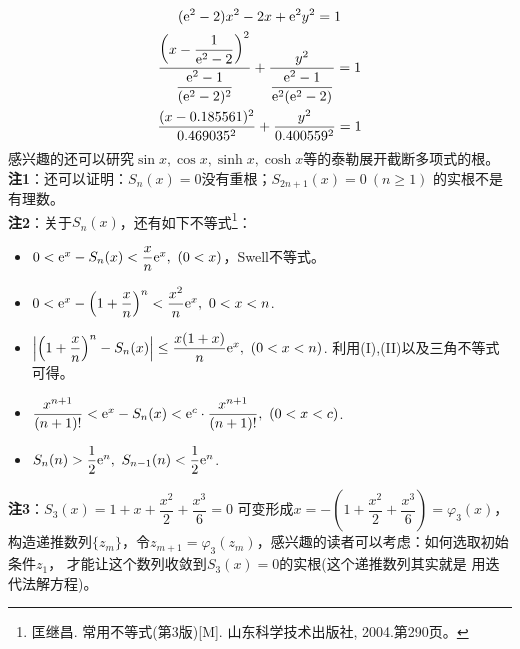 \begin{enumerate}[label={【\textbf{例\thechapter.\arabic*}】},
 leftmargin=\inteval{\myenumleftmargin}pt,
 itemsep=\inteval{\myenumitempsep}pt,
 itemindent=\inteval{\myenumitemindent}pt]
\begin{gather*}
    (\mathrm{e}^2-2)x^2-2x+\mathrm{e}^2y^2=1 \\
    \dfrac{\left(x-\dfrac{1}{\mathrm{e}^2-2}\right)^2}{\dfrac{\mathrm{e}^2-1}{(\mathrm{e}^2-2)^2}}+
    \dfrac{y^2}{\dfrac{\mathrm{e}^2-1}{\mathrm{e}^2(\mathrm{e}^2-2)}}=1 \\
    \dfrac{(x-0.185561)^2}{0.469035^2}+\dfrac{y^2}{0.400559^2}=1
\end{gather*}
感兴趣的还可以研究$ \sin x,\cos x,\sinh x,\cosh x $等的泰勒展开截断多项式的根。\\
\textbf{注1}：还可以证明：$ S_n(x)=0 $没有重根；$ S_{2n+1}(x)=0\ (n\geq 1) $
的实根不是有理数。\\
\textbf{注2}：关于$ S_n(x) $，还有如下不等式\footnote{匡继昌. 
    常用不等式(第3版)[M]. 山东科学技术出版社, 2004.第290页。}：
\begin{itemize}
\item $ 0<\e^x-S_n(x)<\dfrac{x}{n}\e^x,\ (0<x) $，Swell不等式。
\item $ 0<\mathrm{e}^x-\left(1+\dfrac{x}{n}\right)^n<\dfrac{x^2}{n}\mathrm{e}^x,
\ 0<x<n $.
\item $ \left|\left(1+\dfrac{x}{n}\right)^n-S_n(x)\right|
\leq \dfrac{x(1+x)}{n}\mathrm{e}^x,\ (0<x<n) $. 利用(I),(II)以及三角不等式可得。
\item $ \dfrac{x^{n+1}}{(n+1)!}<\mathrm{e}^x-S_n(x)<\mathrm{e}^c \cdot \dfrac{x^{n+1}}
{(n+1)!},\ (0<x<c) $.
\item $ S_n(n)>\dfrac{1}{2}\e^n,\ S_{n-1}(n)<\dfrac{1}{2}\e^n $.
\end{itemize}
\textbf{注3}：$ S_3(x)=1+x+\dfrac{x^2}{2}+\dfrac{x^3}{6}=0 $
可变形成$ x=-\left(1+\dfrac{x^2}{2}+\dfrac{x^3}{6}\right)=
\varphi_3(x) $，构造递推数列$ \{z_m\} $，令$ z_{m+1}=
\varphi_3(z_m) $，感兴趣的读者可以考虑：如何选取初始条件$ z_1 $，
才能让这个数列收敛到$ S_3(x)=0 $的实根(这个递推数列其实就是
用迭代法解方程)。


\end{enumerate}
